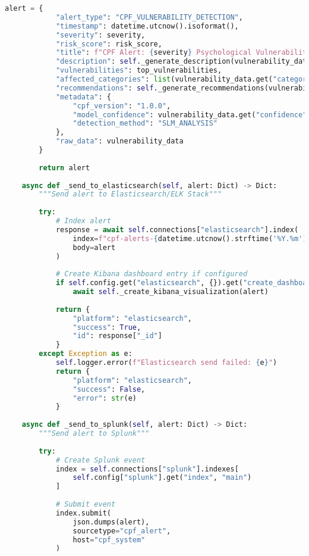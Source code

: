 \documentclass[11pt,a4paper]{article}
\begin{document}
\begin{lstlisting}[language=Python, caption=SIEM Integration Module]
        alert = {
            "alert_type": "CPF_VULNERABILITY_DETECTION",
            "timestamp": datetime.utcnow().isoformat(),
            "severity": severity,
            "risk_score": risk_score,
            "title": f"CPF Alert: {severity} Psychological Vulnerability Detected",
            "description": self._generate_description(vulnerability_data),
            "vulnerabilities": top_vulnerabilities,
            "affected_categories": list(vulnerability_data.get("categories", {}).keys()),
            "recommendations": self._generate_recommendations(vulnerability_data),
            "metadata": {
                "cpf_version": "1.0.0",
                "model_confidence": vulnerability_data.get("confidence", 0.0),
                "detection_method": "SLM_ANALYSIS"
            },
            "raw_data": vulnerability_data
        }
        
        return alert
    
    async def _send_to_elasticsearch(self, alert: Dict) -> Dict:
        """Send alert to Elasticsearch/ELK Stack"""
        
        try:
            # Index alert
            response = await self.connections["elasticsearch"].index(
                index=f"cpf-alerts-{datetime.utcnow().strftime('%Y.%m')}",
                body=alert
            )
            
            # Create Kibana dashboard entry if configured
            if self.config.get("elasticsearch", {}).get("create_dashboard"):
                await self._create_kibana_visualization(alert)
            
            return {
                "platform": "elasticsearch",
                "success": True,
                "id": response["_id"]
            }
        except Exception as e:
            self.logger.error(f"Elasticsearch send failed: {e}")
            return {
                "platform": "elasticsearch",
                "success": False,
                "error": str(e)
            }
    
    async def _send_to_splunk(self, alert: Dict) -> Dict:
        """Send alert to Splunk"""
        
        try:
            # Create Splunk event
            index = self.connections["splunk"].indexes[
                self.config["splunk"].get("index", "main")
            ]
            
            # Submit event
            index.submit(
                json.dumps(alert),
                sourcetype="cpf_alert",
                host="cpf_system"
            )
            

\end{lstlisting}
\end{document}
